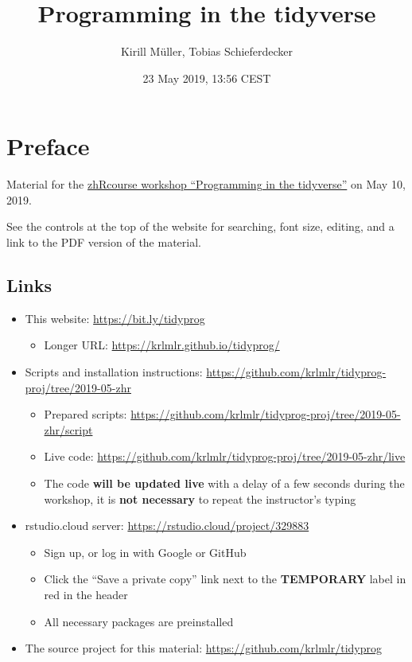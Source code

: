 \documentclass[]{book}
\title{Programming in the tidyverse}
\author{Kirill Müller, Tobias Schieferdecker}
\date{23 May 2019, 13:56 CEST}
\providecommand{\tightlist}{%
  \setlength{\itemsep}{0pt}\setlength{\parskip}{0pt}}
\begin{document}
\maketitle

{
\setcounter{tocdepth}{1}
\tableofcontents
}
\hypertarget{preface}{%
\chapter*{Preface}\label{preface}}

Material for the \href{https://www.zhrcourses.uzh.ch/en/programm2019/tidyverse.html}{zhRcourse workshop ``Programming in the tidyverse''} on May 10, 2019.

See the controls at the top of the website for searching, font size, editing, and a link to the PDF version of the material.

\hypertarget{links}{%
\section*{Links}\label{links}}

\begin{itemize}
\tightlist
\item
  This website: \url{https://bit.ly/tidyprog}

  \begin{itemize}
  \tightlist
  \item
    Longer URL: \url{https://krlmlr.github.io/tidyprog/}
  \end{itemize}
\item
  Scripts and installation instructions: \url{https://github.com/krlmlr/tidyprog-proj/tree/2019-05-zhr}

  \begin{itemize}
  \tightlist
  \item
    Prepared scripts: \url{https://github.com/krlmlr/tidyprog-proj/tree/2019-05-zhr/script}
  \item
    Live code: \url{https://github.com/krlmlr/tidyprog-proj/tree/2019-05-zhr/live}
  \item
    The code \textbf{will be updated live} with a delay of a few seconds during the workshop, it is \textbf{not necessary} to repeat the instructor's typing
  \end{itemize}
\item
  rstudio.cloud server: \url{https://rstudio.cloud/project/329883}

  \begin{itemize}
  \tightlist
  \item
    Sign up, or log in with Google or GitHub
  \item
    Click the ``Save a private copy'' link next to the \textbf{TEMPORARY} label in red in the header
  \item
    All necessary packages are preinstalled
  \end{itemize}
\item
  The source project for this material: \url{https://github.com/krlmlr/tidyprog}
\end{itemize}
\end{document}
